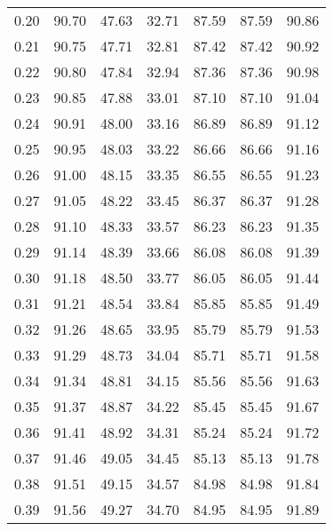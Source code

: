 \begin{tabular}{|c|c|c|c|c|c|c|}
      0.20 &     90.70 &     47.63 &      32.71 &   87.59 &      87.59 &         90.86 \\
      0.21 &     90.75 &     47.71 &      32.81 &   87.42 &      87.42 &         90.92 \\
      0.22 &     90.80 &     47.84 &      32.94 &   87.36 &      87.36 &         90.98 \\
      0.23 &     90.85 &     47.88 &      33.01 &   87.10 &      87.10 &         91.04 \\
      0.24 &     90.91 &     48.00 &      33.16 &   86.89 &      86.89 &         91.12 \\
      0.25 &     90.95 &     48.03 &      33.22 &   86.66 &      86.66 &         91.16 \\
      0.26 &     91.00 &     48.15 &      33.35 &   86.55 &      86.55 &         91.23 \\
      0.27 &     91.05 &     48.22 &      33.45 &   86.37 &      86.37 &         91.28 \\
      0.28 &     91.10 &     48.33 &      33.57 &   86.23 &      86.23 &         91.35 \\
      0.29 &     91.14 &     48.39 &      33.66 &   86.08 &      86.08 &         91.39 \\
      0.30 &     91.18 &     48.50 &      33.77 &   86.05 &      86.05 &         91.44 \\
      0.31 &     91.21 &     48.54 &      33.84 &   85.85 &      85.85 &         91.49 \\
      0.32 &     91.26 &     48.65 &      33.95 &   85.79 &      85.79 &         91.53 \\
      0.33 &     91.29 &     48.73 &      34.04 &   85.71 &      85.71 &         91.58 \\
      0.34 &     91.34 &     48.81 &      34.15 &   85.56 &      85.56 &         91.63 \\
      0.35 &     91.37 &     48.87 &      34.22 &   85.45 &      85.45 &         91.67 \\
      0.36 &     91.41 &     48.92 &      34.31 &   85.24 &      85.24 &         91.72 \\
      0.37 &     91.46 &     49.05 &      34.45 &   85.13 &      85.13 &         91.78 \\
      0.38 &     91.51 &     49.15 &      34.57 &   84.98 &      84.98 &         91.84 \\
      0.39 &     91.56 &     49.27 &      34.70 &   84.95 &      84.95 &         91.89 \\

\end{tabular}
